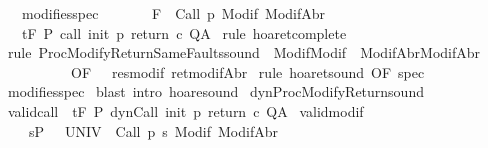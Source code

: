 \begin{isabellebody}
\ \ \ modifies{\isacharunderscore}spec{\isacharcolon}\ \ \ \ \isanewline
\ \ {\isachardoublequoteopen}{\isasymforall}{\isasymsigma}{\isachardot}\ {\isasymGamma}{\isacharcomma}{\isasymTheta}{\isasymturnstile}\isactrlbsub {\isacharslash}F\isactrlesub \ {\isacharbraceleft}{\isasymsigma}{\isacharbraceright}\ {\isacharparenleft}Call\ p{\isacharparenright}\ {\isacharparenleft}Modif\ {\isasymsigma}{\isacharparenright}{\isacharcomma}{\isacharparenleft}ModifAbr\ {\isasymsigma}{\isacharparenright}{\isachardoublequoteclose}\isanewline
\ \ \ {\isachardoublequoteopen}{\isasymGamma}{\isacharcomma}{\isasymTheta}{\isasymturnstile}\isactrlsub t\isactrlbsub {\isacharslash}F\isactrlesub \ P\ {\isacharparenleft}call\ init\ p\ return\ c{\isacharparenright}\ Q{\isacharcomma}A{\isachardoublequoteclose}\isanewline
%
\isadelimproof
%
\endisadelimproof
%
\isatagproof
{}\isamarkupfalse%
\ {\isacharparenleft}rule\ hoaret{\isacharunderscore}complete{\isacharprime}{\isacharparenright}\ \isanewline
{}\isamarkupfalse%
\ {\isacharparenleft}rule\ ProcModifyReturnSameFaults{\isacharunderscore}sound\ {\isacharbrackleft}\ Modif{\isacharequal}Modif\ \ ModifAbr{\isacharequal}ModifAbr{\isacharcomma}\isanewline
\ \ \ \ \ \ \ \ \ \ OF\ {\isacharunderscore}\ {\isacharunderscore}\ res{\isacharunderscore}modif\ ret{\isacharunderscore}modifAbr{\isacharbrackright}{\isacharparenright}\isanewline
{}\isamarkupfalse%
\ {\isacharparenleft}rule\ hoaret{\isacharunderscore}sound\ {\isacharbrackleft}OF\ spec{\isacharbrackright}{\isacharparenright}\isanewline
{}\isamarkupfalse%
\ modifies{\isacharunderscore}spec\isanewline
{}\isamarkupfalse%
\ {\isacharparenleft}blast\ intro{\isacharcolon}\ hoare{\isacharunderscore}sound{\isacharparenright}\isanewline
{}\isamarkupfalse%
%
\endisatagproof
{\isafoldproof}%
%
\isadelimproof
%
\endisadelimproof
%
\isamarkuptrue%
\isamarkupfalse%
\ dynProcModifyReturn{\isacharunderscore}sound{\isacharcolon}\isanewline
{}\ valid{\isacharunderscore}call{\isacharcolon}\ {\isachardoublequoteopen}{\isasymGamma}{\isacharcomma}{\isasymTheta}\ {\isasymTurnstile}\isactrlsub t\isactrlbsub {\isacharslash}F\isactrlesub \ P\ dynCall\ init\ p\ return{\isacharprime}\ c\ Q{\isacharcomma}A{\isachardoublequoteclose}\isanewline
{}\ valid{\isacharunderscore}modif{\isacharcolon}\ \isanewline
\ \ \ \ {\isachardoublequoteopen}{\isasymforall}s{\isasymin}P{\isachardot}\ {\isasymforall}{\isasymsigma}{\isachardot}\ {\isasymGamma}{\isacharcomma}{\isasymTheta}\ {\isasymTurnstile}\isactrlbsub {\isacharslash}UNIV\isactrlesub \ {\isacharbraceleft}{\isasymsigma}{\isacharbraceright}\ {\isacharparenleft}Call\ {\isacharparenleft}p\ s{\isacharparenright}{\isacharparenright}\ {\isacharparenleft}Modif\ {\isasymsigma}{\isacharparenright}{\isacharcomma}{\isacharparenleft}ModifAbr\ {\isasymsigma}{\isacharparenright}{\isachardoublequoteclose}\ \isanewline

\end{isabellebody}
